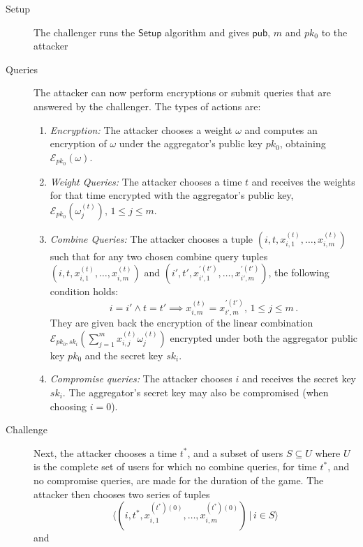 \documentclass[twocolumn]{autart}
\begin{document}
\begin{description}
    \item[Setup] The challenger runs the $\mathsf{Setup}$ algorithm and gives $\mathsf{pub}$, $m$ and $pk_0$ to the attacker
    \item[Queries] The attacker can now perform encryptions or submit queries that are answered by the challenger. The types of actions are:
    \begin{enumerate}
        \item \textit{Encryption:} The attacker chooses a weight $\omega$ and computes an encryption of $\omega$ under the aggregator's public key $pk_0$, obtaining $\mathcal{E}_{pk_0}(\omega)$.
        \item \textit{Weight Queries:} The attacker chooses a time $t$ and receives the weights for that time encrypted with the aggregator's public key, $\mathcal{E}_{pk_0}(\omega^{(t)}_{j}),\,1\leq j\leq m$.
        \item \textit{Combine Queries:} The attacker chooses a tuple $(i,t,x^{(t)}_{i,1},\dots,x^{(t)}_{i,m})$ such that for any two chosen combine query tuples $(i,t,x^{(t)}_{i,1},\dots,x^{(t)}_{i,m})$ and $(i',t',x^{\prime(t')}_{i',1},\dots,x^{\prime(t')}_{i',m})$, the following condition holds:
        \begin{equation*}
            i = i' \wedge t = t' \implies x^{(t)}_{i,m} = x^{\prime(t')}_{i',m},\,1\leq j\leq m\,.
        \end{equation*}
        They are given back the encryption of the linear combination $\mathcal{E}_{pk_0,sk_i}(\sum^m_{j=1}x^{(t)}_{i,j}\omega^{(t)}_j)$ encrypted under both the aggregator public key $pk_0$ and the secret key $sk_i$.
        \item \textit{Compromise queries:} The attacker chooses $i$ and receives the secret key $sk_i$. The aggregator's secret key may also be compromised (when choosing $i=0$).
    \end{enumerate} 
    \item[Challenge] Next, the attacker chooses a time $t^*$, and a subset of users $S \subseteq U$ where $U$ is the complete set of users for which no combine queries, for time $t^*$, and no compromise queries, are made for the duration of the game. The attacker then chooses two series of tuples
    \begin{equation*}
        \langle(i,t^*,x^{(t^*)(0)}_{i,1},\dots,x^{(t^*)(0)}_{i,m})\,|\,i \in S\rangle
    \end{equation*}
    and
    \begin{equation*}

\end{equation*}
\end{description}
\end{document}
